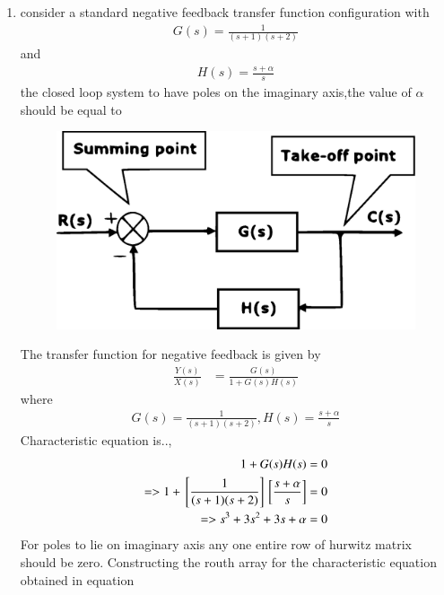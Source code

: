 \begin{enumerate}[label=\thesection.\arabic*.,ref=\thesection.\theenumi]

\item
consider a standard negative feedback transfer function configuration with
\begin{align}
G(s) = \frac{1}{(s+1)(s+2)}
\end{align}
and
\begin{align}
H(s) = \frac{s+\alpha}{s}
\end{align}
the closed loop system to have poles on the imaginary axis,the value of $\alpha$ should be equal to
\begin{figure}[!ht]
\centering
\includegraphics[width=\columnwidth]{./fig/ee18btech11020_basic_block_diagram.eps}
\caption{}
\label{fig:sec_order}
\end{figure}
\solution The transfer function for negative feedback is given by
\begin{align}
\frac{Y(s)}{X(s)} &= \frac{G(s)}{1+G(s)H(s)}
\end{align}
where 
\begin{align}
G(s) = \frac{1}{(s+1)(s+2)},
H(s) = \frac{s+\alpha}{s}
\end{align}
Characteristic equation is..,
\begin{align}
 1 + G(s)H(s) = 0
\\
=> 1 + {}\left[\frac{1}{(s+1)(s+2)}\right]{}\left[\frac{s+\alpha}{s}\right] = 0
\\
=> s^3+3s^2+3s+\alpha = 0
\end{align}
For poles to lie on imaginary axis any one entire row of hurwitz matrix should be zero.
Constructing the routh array for the characteristic equation obtained in equation
\begin{align}

\end{align}
\end{enumerate}
